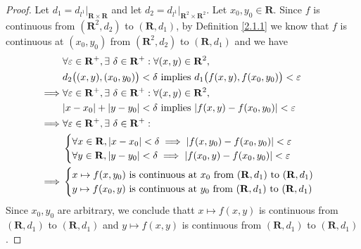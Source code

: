 \begin{proof}
    Let \(d_1 = d_{l^1}|_{\mathbf{R} \times \mathbf{R}}\) and let \(d_2 = d_{l^1}|_{\mathbf{R}^2 \times \mathbf{R}^2}\).
    Let \(x_0, y_0 \in \mathbf{R}\).
    Since \(f\) is continuous from \((\mathbf{R}^2, d_2)\) to \((\mathbf{R}, d_1)\), by Definition \ref{2.1.1} we know that \(f\) is continuous at \((x_0, y_0)\) from \((\mathbf{R}^2, d_2)\) to \((\mathbf{R}, d_1)\) and we have
    \begin{align*}
                 & \forall \varepsilon \in \mathbf{R}^+, \exists\ \delta \in \mathbf{R}^+ : \forall (x, y) \in \mathbf{R}^2,       \\
                 & d_2\big((x, y), (x_0, y_0)\big) < \delta \text{ implies } d_1\big(f(x, y), f(x_0, y_0)\big) < \varepsilon       \\
        \implies & \forall \varepsilon \in \mathbf{R}^+, \exists\ \delta \in \mathbf{R}^+ : \forall (x, y) \in \mathbf{R}^2,       \\
                 & \abs*{x - x_0} + \abs*{y - y_0} < \delta \text{ implies } \abs*{f(x, y) - f(x_0, y_0)} < \varepsilon            \\
        \implies & \forall \varepsilon \in \mathbf{R}^+, \exists\ \delta \in \mathbf{R}^+ :                                        \\
                 & \begin{cases}
                       \forall x \in \mathbf{R}, \abs*{x - x_0} < \delta \implies \abs*{f(x, y_0) - f(x_0, y_0)} < \varepsilon \\
                       \forall y \in \mathbf{R}, \abs*{y - y_0} < \delta \implies \abs*{f(x_0, y) - f(x_0, y_0)} < \varepsilon
                   \end{cases}         \\
        \implies & \begin{cases}
                       x \mapsto f(x, y_0) \text{ is continuous at } x_0 \text{ from } (\mathbf{R}, d_1) \text{ to } (\mathbf{R}, d_1) \\
                       y \mapsto f(x_0, y) \text{ is continuous at } y_0 \text{ from } (\mathbf{R}, d_1) \text{ to } (\mathbf{R}, d_1)
                   \end{cases}
    \end{align*}
    Since \(x_0, y_0\) are arbitrary, we conclude thatt \(x \mapsto f(x, y)\) is continuous from \((\mathbf{R}, d_1)\) to \((\mathbf{R}, d_1)\) and \(y \mapsto f(x, y)\) is continuous from \((\mathbf{R}, d_1)\) to \((\mathbf{R}, d_1)\).
\end{proof}

